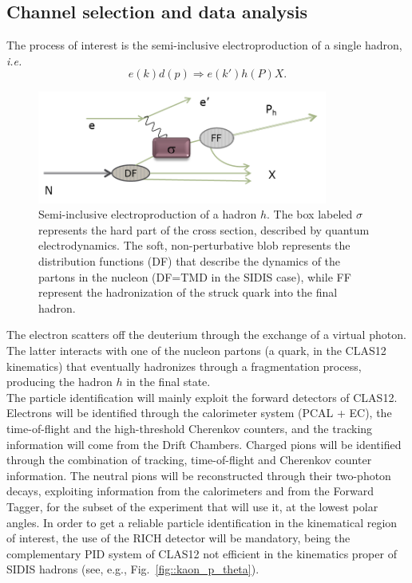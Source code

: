 \subsection{Channel selection and data analysis}
\label{sec::channel_sel}
%
%
The process of interest is the semi-inclusive electroproduction of a single hadron, \textit{i.e.}
%
\begin{equation}
e (k) d (p) \Rightarrow e (k') h (P) X .
\end{equation}
%
%
\begin{figure}
\centering
\includegraphics[width=0.85\textwidth]{sidis/sidis_drawings.png}
\caption{\label{fig::sidis} Semi-inclusive electroproduction of a hadron $h$. The box labeled $\sigma$ represents the hard part of the cross section, described by quantum electrodynamics. The soft, non-perturbative blob represents the distribution functions (DF) that describe the dynamics of the partons in the nucleon (DF=TMD in the SIDIS case), while FF represent the hadronization of the struck quark into the final hadron.}
\end{figure}
%
The electron scatters off the deuterium through the exchange of a virtual photon. The latter interacts with one of the nucleon partons (a quark, in the CLAS12 kinematics) that eventually hadronizes through a fragmentation process, producing the hadron $h$ in the final state.\\
The particle identification will mainly exploit the forward detectors of CLAS12. Electrons will be identified through the calorimeter system (PCAL + EC), the time-of-flight and the high-threshold Cherenkov counters, and the tracking information will come from the Drift Chambers. 
Charged pions will be identified through the combination of tracking, time-of-flight and Cherenkov counter information. The neutral pions will be reconstructed through their two-photon decays, exploiting information from the calorimeters and from the Forward Tagger, for the subset of the experiment that will use it, at the lowest polar angles. 
In order to get a reliable particle identification in the kinematical region of interest, the use of the RICH detector will be mandatory, being the complementary PID system of CLAS12 not efficient in the kinematics proper of SIDIS hadrons (see, e.g., Fig.~\ref{fig::kaon_p_theta}). 
